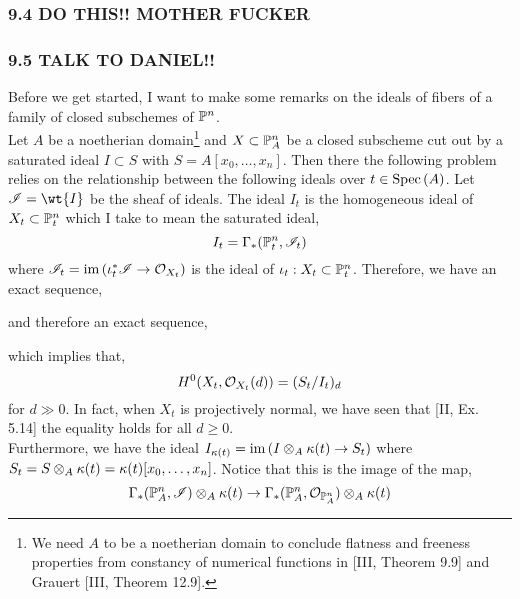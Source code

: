\documentclass[12pt]{article}
\begin{document}
\subsubsection{9.4 DO THIS!! MOTHER FUCKER}



\subsubsection{9.5 TALK TO DANIEL!!}

Before we get started, I want to make some remarks on the ideals of fibers of a family of closed subschemes of $\P^n$. 
\bigskip\\
Let $A$ be a noetherian domain\footnote{We need $A$ to be a noetherian domain to conclude flatness and freeness properties from constancy of numerical functions in [III, Theorem 9.9] and Grauert [III, Theorem 12.9].} and $X \subset \P^n_A$ be a closed subscheme cut out by a saturated ideal $I \subset S$ with $S = A[x_0, \dots, x_n]$. Then there the following problem relies on the relationship between the following ideals over $t \in \Spec{A}$. Let $\I = \wt{I}$ be the sheaf of ideals. The ideal $I_t$ is the homogeneous ideal of $X_t \subset \P^n_t$ which I take to mean the saturated ideal,
\[ I_t = \Gamma_*(\P^n_t, \I_t) \]
where $\I_t = \im{(\iota_t^* \I \to \struct{X_t})}$ is the ideal of $\iota_t : X_t \subset \P^n_t$. Therefore, we have an exact sequence,
\begin{center}
\end{center}
and therefore an exact sequence,
\begin{center}
\end{center}
which implies that,
\[ H^0(X_t, \struct{X_t}(d)) = (S_t/I_t)_d \]
for $d \gg 0$. In fact, when $X_t$ is projectively normal, we have seen that [II, Ex. 5.14] the equality holds for all $d \ge 0$.
\bigskip\\
Furthermore, we have the ideal $I_{\kappa(t)} = \im{(I \ot_A \kappa(t) \to S_t)}$ where $S_t = S \ot_A \kappa(t) = \kappa(t)[x_0, \dots, x_n]$. Notice that this is the image of the map,
\[ \Gamma_*(\P^n_A, \I) \ot_A \kappa(t) \to \Gamma_*(\P^n_A, \struct{\P^n_A}) \ot_A \kappa(t) \]
\end{document}
